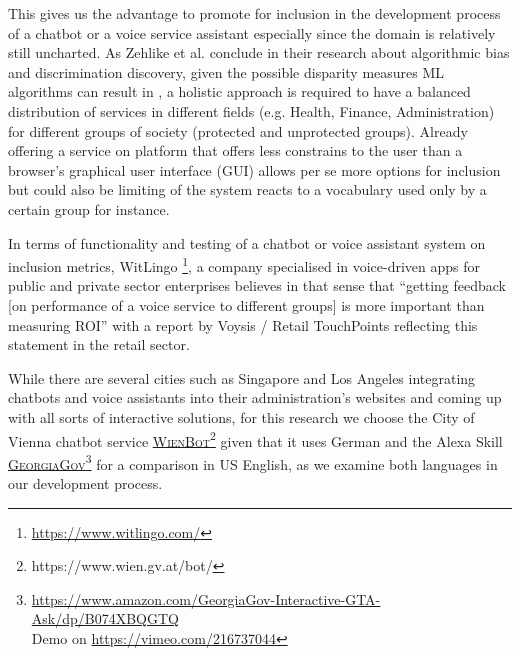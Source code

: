 This gives us the advantage to promote for inclusion in the development process of a chatbot or a voice service assistant especially since the domain is relatively still uncharted. As Zehlike et al. conclude in their research about algorithmic bias and discrimination discovery, given the possible disparity measures ML algorithms can result in \cite{fa:ir}, a holistic approach is required to have a balanced distribution of services in different fields (e.g. Health, Finance, Administration) for different groups of society (protected and unprotected groups).
Already offering a service on platform that offers less constrains to the user than a browser's graphical user interface (GUI) allows per se more options for inclusion but could also be limiting of the system reacts to a vocabulary used only by a certain group for instance.

In terms of functionality and testing of a chatbot or voice assistant system on inclusion metrics, WitLingo \footnote{\url{https://www.witlingo.com/}}, a company %
specialised in voice-driven apps %
for public and private sector enterprises believes in that sense that ``getting feedback [on performance of a voice service to different groups] is more important than measuring ROI'' \cite{witlingo:bouzid} with a report by Voysis / Retail TouchPoints \cite{voysis:report} reflecting this statement in the retail sector.



%


	While there are several cities such as Singapore and Los Angeles integrating chatbots and voice assistants into their administration's websites and coming up with all sorts of interactive solutions,
	for this research we choose the City of Vienna chatbot service \href{https://www.wien.gv.at/bot/}{\textsc{WienBot}\footnote{\url{https://www.wien.gv.at/bot/}}} given that it uses German 
	and the Alexa Skill \href{https://www.amazon.com/GeorgiaGov-Interactive-GTA-Ask/dp/B074XBQGTQ}{\textsc{GeorgiaGov}}\footnote{\url{https://www.amazon.com/GeorgiaGov-Interactive-GTA-Ask/dp/B074XBQGTQ}\\ Demo on \url{https://vimeo.com/216737044}} for a comparison in US English, as we examine both languages in our development process.


